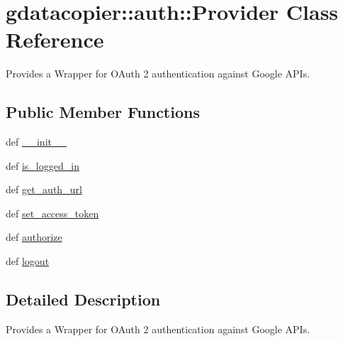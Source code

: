 \hypertarget{classgdatacopier_1_1auth_1_1_provider}{\section{gdatacopier\-:\-:auth\-:\-:\-Provider \-Class \-Reference}
\label{classgdatacopier_1_1auth_1_1_provider}
}


\-Provides a \-Wrapper for \-O\-Auth 2 authentication against \-Google \-A\-P\-Is.  


\subsection*{\-Public \-Member \-Functions}
\begin{DoxyCompactItemize}
\item 
def \hyperlink{classgdatacopier_1_1auth_1_1_provider_a4d59ebd1d52130ce3fbbd4620e5b60c5}{\-\_\-\-\_\-init\-\_\-\-\_\-}
\item 
def \hyperlink{classgdatacopier_1_1auth_1_1_provider_a9476cc2441f0827d9aada319323d3319}{is\-\_\-logged\-\_\-in}
\item 
def \hyperlink{classgdatacopier_1_1auth_1_1_provider_ae44f3d26732103d8e4ff852ba17a36e0}{get\-\_\-auth\-\_\-url}
\item 
def \hyperlink{classgdatacopier_1_1auth_1_1_provider_a63172775123899ed94d8f9c643df4c6f}{set\-\_\-access\-\_\-token}
\item 
def \hyperlink{classgdatacopier_1_1auth_1_1_provider_a42a815c0ef56b737b77c9dfbaddef780}{authorize}
\item 
def \hyperlink{classgdatacopier_1_1auth_1_1_provider_acb441fb06f3f99ef658340a675ff5301}{logout}
\end{DoxyCompactItemize}


\subsection{\-Detailed \-Description}
\-Provides a \-Wrapper for \-O\-Auth 2 authentication against \-Google \-A\-P\-Is. 



